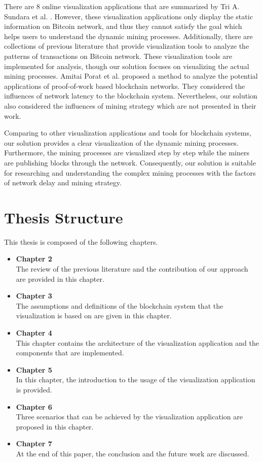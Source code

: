 There are 8 online visualization applications that are summarized by Tri A. Sundara et al. \cite{Sundara2017}. However, these visualization applications only display the static information on Bitcoin network, and thus they cannot satisfy the goal which helps users to understand the dynamic mining processes. Additionally, there are collections of previous literature that provide visualization tools \cite{Battista2015, Kuzuno2017, McGinn2016, Saublet2015, Fleder2015, Baumann2014} to analyze the patterns of transactions on Bitcoin network. These visualization tools are implemented for analysis, though our solution focuses on visualizing the actual mining processes. Amitai Porat et al. \cite{Porat} proposed a method to analyze the potential applications of proof-of-work based blockchain networks. They considered the influences of network latency to the blockchain system. Nevertheless, our solution also considered the influences of mining strategy which are not presented in their work.

Comparing to other visualization applications and tools for blockchain systems, our solution provides a clear visualization of the dynamic mining processes. Furthermore, the mining processes are visualized step by step while the miners are publishing blocks through the network. Consequently, our solution is suitable for researching and understanding the complex mining processes with the factors of network delay and mining strategy.

\section{Thesis Structure}

This thesis is composed of the following chapters.

\begin{itemize}
    \item \textbf{Chapter 2} \\
        The review of the previous literature and the contribution of our approach are provided in this chapter.
    \item \textbf{Chapter 3} \\
        The assumptions and definitions of the blockchain system that the visualization is based on are given in this chapter.
    \item \textbf{Chapter 4} \\
        This chapter contains the architecture of the visualization application and the components that are implemented.
    \item \textbf{Chapter 5} \\
        In this chapter, the introduction to the usage of the visualization application is provided.
    \item \textbf{Chapter 6} \\
        Three scenarios that can be achieved by the visualization application are proposed in this chapter.
    \item \textbf{Chapter 7} \\
        At the end of this paper, the conclusion and the future work are discussed.
\end{itemize}
